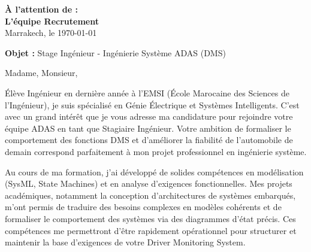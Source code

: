 \documentclass[10pt,a4paper]{../../altacv}
\makeatletter
\renewcommand{\makecvheader}{%
  \begingroup
    \raggedright\color{emphasis}%
    {\Huge\bfseries\MakeUppercase{\@name}\par}
    \medskip
    {\large\bfseries\color{accent}\@tagline\par}
    \medskip
    {\footnotesize\bfseries\@personalinfo\par}
  \endgroup\medskip
}
\makeatother
\begin{document}

\makecvheader

\bigskip
\medskip

\begin{flushright}
  {\color{emphasis}\textbf{À l'attention de :}} \\[2pt]
  \textbf{L'équipe Recrutement} \\[20pt]
  Marrakech, le \today
\end{flushright}
\bigskip

\bigskip

{\color{accent}\textbf{Objet :}} Stage Ingénieur - Ingénierie Système ADAS (DMS)

\bigskip\bigskip

Madame, Monsieur,

\vspace{0.4cm}

Élève Ingénieur en dernière année à l'EMSI (École Marocaine des Sciences de l'Ingénieur), je suis spécialisé en Génie Électrique et Systèmes Intelligents. C'est avec un grand intérêt que je vous adresse ma candidature pour rejoindre votre équipe ADAS en tant que Stagiaire Ingénieur. Votre ambition de formaliser le comportement des fonctions DMS et d'améliorer la fiabilité de l'automobile de demain correspond parfaitement à mon projet professionnel en ingénierie système.

\vspace{0.4cm}

Au cours de ma formation, j'ai développé de solides compétences en modélisation (SysML, State Machines) et en analyse d'exigences fonctionnelles. Mes projets académiques, notamment la conception d'architectures de systèmes embarqués, m'ont permis de traduire des besoins complexes en modèles cohérents et de formaliser le comportement des systèmes via des diagrammes d'état précis. Ces compétences me permettront d'être rapidement opérationnel pour structurer et maintenir la base d'exigences de votre Driver Monitoring System.
\end{document}

